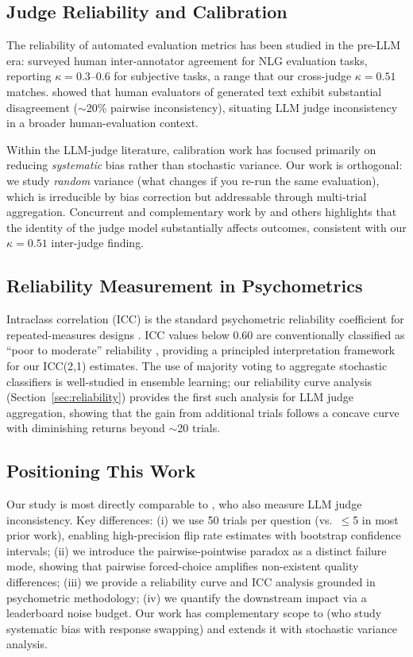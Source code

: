 \documentclass{ijclclp}
\begin{document}
\subsection{Judge Reliability and Calibration}

The reliability of automated evaluation metrics has been studied in the pre-LLM era: \citet{amidei2019agreement} surveyed human inter-annotator agreement for NLG evaluation tasks, reporting $\kappa = 0.3$--$0.6$ for subjective tasks, a range that our cross-judge $\kappa = 0.51$ matches. \citet{clark2021all} showed that human evaluators of generated text exhibit substantial disagreement ($\sim$20\% pairwise inconsistency), situating LLM judge inconsistency in a broader human-evaluation context.

Within the LLM-judge literature, calibration work has focused primarily on reducing \textit{systematic} bias rather than stochastic variance. Our work is orthogonal: we study \textit{random} variance (what changes if you re-run the same evaluation), which is irreducible by bias correction but addressable through multi-trial aggregation. Concurrent and complementary work by \citet{shankar2024validates} and others highlights that the identity of the judge model substantially affects outcomes, consistent with our $\kappa = 0.51$ inter-judge finding.

\subsection{Reliability Measurement in Psychometrics}

Intraclass correlation (ICC) is the standard psychometric reliability coefficient for repeated-measures designs \citep{amidei2019agreement}. ICC values below 0.60 are conventionally classified as ``poor to moderate'' reliability \citep{clark2021all}, providing a principled interpretation framework for our ICC(2,1) estimates. The use of majority voting to aggregate stochastic classifiers is well-studied in ensemble learning; our reliability curve analysis (Section~\ref{sec:reliability}) provides the first such analysis for LLM judge aggregation, showing that the gain from additional trials follows a concave curve with diminishing returns beyond $\sim$20 trials.

\subsection{Positioning This Work}

Our study is most directly comparable to \citet{stureborg2024large}, who also measure LLM judge inconsistency. Key differences: (i) we use 50 trials per question (vs.\ $\leq$5 in most prior work), enabling high-precision flip rate estimates with bootstrap confidence intervals; (ii) we introduce the pairwise-pointwise paradox as a distinct failure mode, showing that pairwise forced-choice amplifies non-existent quality differences; (iii) we provide a reliability curve and ICC analysis grounded in psychometric methodology; (iv) we quantify the downstream impact via a leaderboard noise budget. Our work has complementary scope to \citet{wang2023large} (who study systematic bias with response swapping) and extends it with stochastic variance analysis.
\end{document}
